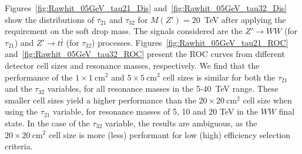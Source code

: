 
Figures~\ref{fig:Rawhit_05GeV_tau21_Dis} and~\ref{fig:Rawhit_05GeV_tau32_Dis} 
show the distributions of $\tau_{21}$ and $\tau_{32}$ for $M(Z')=20$~TeV 
after applying the requirement on the soft drop mass. The signals considered are 
the $Z'\rightarrow WW$ (for $\tau_{21}$) and 
$Z' \rightarrow t\bar{t}$ (for $\tau_{32}$) processes. 
Figures~\ref{fig:Rawhit_05GeV_tau21_ROC} and~\ref{fig:Rawhit_05GeV_tau32_ROC} 
present the ROC curves from different detector cell sizes and resonance masses, 
respectively. We find that the performance of the $1\times1~\mathrm{cm}^2$ and $5\times5~\mathrm{cm}^2$ cell sizes is similar for both the $ \tau_{21} $ and the $ \tau_{32} $ variables, for
 all resonance masses in the 5-40~TeV range. These smaller cell sizes yield a higher performance than 
 the $20\times20~\mathrm{cm}^2$ cell size when using the $ \tau_{21} $ variable, for resonance masses of 5, 10 and 20 TeV in the $WW$ final state. In the case of the $ \tau_{32} $ variable, 
  the results are ambiguous, as the $20\times20~\mathrm{cm}^2$ cell size is more (less) performant for low (high) efficiency selection criteria. 


